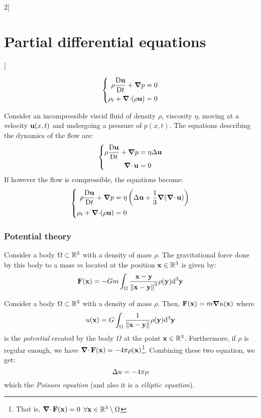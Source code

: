 \documentclass[../../../main_math.tex]{subfiles}
\begin{document}
\begin{multicols}{2}[\section{Partial differential equations}]
\begin{theorem}
    \begin{equation*}
      \left\{
      \begin{aligned}
        \rho\frac{\mathrm{D}\boldsymbol{\mathrm{u}}}{\mathrm{D}t}+\grad p & =0 \\
        \rho_t+\operatorname{\boldsymbol{\mathrm{\nabla}}\cdot}(\rho\boldsymbol{\mathrm{u}})      & =0
      \end{aligned}
      \right.
    \end{equation*}
  \end{theorem}
  \begin{theorem}
    Consider an incompressible viscid fluid of density $\rho$, viscosity $\eta$, moving at a velocity $\boldsymbol{\mathrm{u}}(x,t)$ and undergoing a pressure of $p(x,t)$. The equations describing the dynamics of the flow are:
    \begin{equation*}
      \left\{
      \begin{aligned}
        \rho\frac{\mathrm{D}\boldsymbol{\mathrm{u}}}{\mathrm{D}t}+\grad p & =\eta\Delta\boldsymbol{\mathrm{u}} \\
        \operatorname{\boldsymbol{\mathrm{\nabla}}\cdot}{\boldsymbol{\mathrm{u}}}                 & =0
      \end{aligned}
      \right.
    \end{equation*}
    If however the flow is compressible, the equations become:
    \begin{equation*}
      \left\{
      \begin{aligned}
        \rho\frac{\mathrm{D}\boldsymbol{\mathrm{u}}}{\mathrm{D}t}+\grad p & =\eta\left(\Delta\boldsymbol{\mathrm{u}}+\frac{1}{3}\grad(\operatorname{\boldsymbol{\mathrm{\nabla}}\cdot}{\boldsymbol{\mathrm{u}}})\right) \\
        \rho_t+\operatorname{\boldsymbol{\mathrm{\nabla}}\cdot}(\rho\boldsymbol{\mathrm{u}})      & =0
      \end{aligned}
      \right.
    \end{equation*}
  \end{theorem}
  \subsubsection{Potential theory}
  \begin{proposition}
    Consider a body $\Omega\subset\mathbb{R}^3$ with a density of mass $\rho$. The gravitational force done by this body to a mass $m$ located at the position $\boldsymbol{\mathrm{x}}\in\mathbb{R}^3$ is given by:
    $$\boldsymbol{\mathrm{F}}(\boldsymbol{\mathrm{x}})=-Gm\int_{\Omega}\frac{\boldsymbol{\mathrm{x}}-\boldsymbol{\mathrm{y}}}{{\left\|\boldsymbol{\mathrm{x}}-\boldsymbol{\mathrm{y}}\right\|}^3}\rho(\boldsymbol{\mathrm{y}})\dd^3{\boldsymbol{\mathrm{y}}}$$
  \end{proposition}
  \begin{proposition}
    Consider a body $\Omega\subset\mathbb{R}^3$ with a density of mass $\rho$. Then, $\boldsymbol{\mathrm{F}}(\boldsymbol{\mathrm{x}})=m\grad{u(\boldsymbol{\mathrm{x}})}$ where $$u(\boldsymbol{\mathrm{x}})=G\int_{\Omega}\frac{1}{\left\|\boldsymbol{\mathrm{x}}-\boldsymbol{\mathrm{y}}\right\|}\rho(\boldsymbol{\mathrm{y}})\dd^3{\boldsymbol{\mathrm{y}}}$$ is the \emph{potential} created by the body $\Omega$ at the point $\boldsymbol{\mathrm{x}}\in\mathbb{R}^3$. Furthermore, if $\rho$ is regular enough, we have $\operatorname{\boldsymbol{\mathrm{\nabla}}\cdot}\boldsymbol{\mathrm{F}}(\boldsymbol{\mathrm{x}})=-4\pi\rho(\boldsymbol{\mathrm{x}})$\footnote{That is, $\operatorname{\boldsymbol{\mathrm{\nabla}}\cdot}\boldsymbol{\mathrm{F}}(\boldsymbol{\mathrm{x}})=0$ $\forall\boldsymbol{\mathrm{x}}\in\mathbb{R}^3\setminus\Omega$}. Combining these two equation, we get: $$\Delta u=-4\pi\rho$$ which the \emph{Poisson equation} (and also it is a \emph{elliptic equation}).
  \end{proposition}

\end{multicols}
\end{document}
